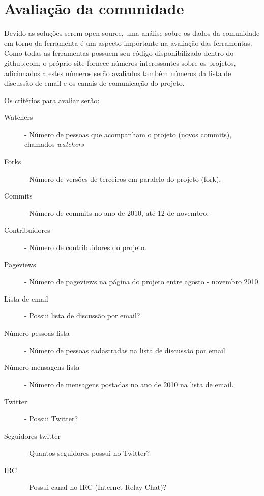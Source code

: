 \section{Avaliação da comunidade}

Devido as soluções serem open source, uma análise sobre os dados da comunidade em torno da ferramenta é um aspecto importante na avaliação das ferramentas. Como todas as ferramentas possuem seu código disponibilizado dentro do github.com, o próprio site fornece números interessantes sobre os projetos, adicionados a estes números serão avaliados também números da lista de discussão de email e os canais de comunicação do projeto.

Os critérios para avaliar serão:

\begin{description}
    \item[Watchers] - Número de pessoas que acompanham o projeto (novos commits), chamados \emph{watchers}
    \item[Forks] - Número de versões de terceiros em paralelo do projeto (fork).
    \item[Commits] - Número de commits no ano de 2010, até 12 de novembro.
    \item[Contribuidores] - Número de contribuidores do projeto.
    \item[Pageviews] - Número de pageviews na página do projeto entre agosto - novembro 2010.
    \item[Lista de email] - Possui lista de discussão por email?
    \item[Número pessoas lista] - Número de pessoas cadastradas na lista de discussão por email. 
    \item[Número mensagens lista] - Número de mensagens postadas no ano de 2010 na lista de email.
    \item[Twitter] - Possui Twitter?
    \item[Seguidores twitter] - Quantos seguidores possui no Twitter?
    \item[IRC] - Possui canal no IRC (Internet Relay Chat)?
\end{description}



